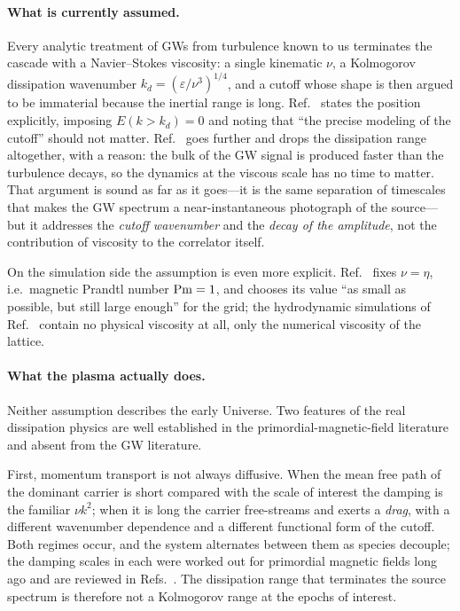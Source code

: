 \documentclass[10pt,prd,aps,nobibnotes,superscriptaddress,preprintnumbers,notitlepage]{revtex4-1}
\begin{document}
\paragraph{What is currently assumed.} Every analytic treatment of GWs from
turbulence known to us terminates the cascade with a Navier--Stokes viscosity: a
single kinematic $\nu$, a Kolmogorov dissipation wavenumber
$k_d=(\varepsilon/\nu^3)^{1/4}$, and a cutoff whose shape is then argued to be
immaterial because the inertial range is long. Ref.~\cite{Niksa:2018ofa} states the
position explicitly, imposing $E(k>k_d)=0$ and noting that ``the precise modeling
of the cutoff'' should not matter. Ref.~\cite{Auclair:2022jod} goes further and drops
the dissipation range altogether, with a reason: the bulk of the GW signal is
produced faster than the turbulence decays, so the dynamics at the viscous scale
has no time to matter. That argument is sound as far as it goes---it is the same
separation of timescales that makes the GW spectrum a near-instantaneous photograph
of the source---but it addresses the \emph{cutoff wavenumber} and the \emph{decay of
the amplitude}, not the contribution of viscosity to the correlator itself.

On the simulation side the assumption is even more explicit. Ref.~\cite{RoperPol:2019wvy}
fixes $\nu=\eta$, i.e.\ magnetic Prandtl number ${\rm Pm}=1$, and chooses its value
``as small as possible, but still large enough'' for the grid; the hydrodynamic
simulations of Ref.~\cite{Auclair:2022jod} contain no physical viscosity at all, only
the numerical viscosity of the lattice.

\paragraph{What the plasma actually does.} Neither assumption describes the early
Universe. Two features of the real dissipation physics are well established in the
primordial-magnetic-field literature and absent from the GW literature.

First, momentum transport is not always diffusive. When the mean free path of the
dominant carrier is short compared with the scale of interest the damping is the
familiar $\nu k^{2}$; when it is long the carrier free-streams and exerts a
\emph{drag}, with a different wavenumber dependence and a different functional form
of the cutoff. Both regimes occur, and the system alternates between them as
species decouple; the damping scales in each were worked out for primordial
magnetic fields long ago \cite{Jedamzik:1996wp,Banerjee:2004df} and are reviewed
in Refs.~\cite{Durrer:2013pga,Subramanian:2015lua}. The dissipation range that terminates
the source spectrum is therefore not a Kolmogorov range at the epochs of interest.
\end{document}
